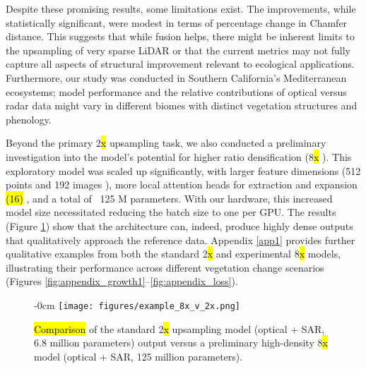 \documentclass[remotesensing,article,accept,pdftex,moreauthors]{Definitions/mdpi}
\begin{document}
Despite these promising results, some limitations exist. The improvements, while statistically significant, were modest in terms of percentage change in Chamfer distance. This suggests that while fusion helps, there might be inherent limits to the upsampling of very sparse LiDAR or that the current metrics may not fully capture all aspects of structural improvement relevant to ecological applications. Furthermore, our study was conducted in Southern California's Mediterranean ecosystems; model performance and the relative contributions of optical versus radar data might vary in different biomes with distinct vegetation structures and phenology.

Beyond the primary 2\hl{x} %
 upsampling task, we also conducted a preliminary investigation into the model's potential for higher ratio densification (8\hl{x}%
). This exploratory model was scaled up significantly, with larger feature dimensions (512 points and 192 images%
), more local attention heads for extraction and expansion \hl{(16)}%
, and a total of ~125 M parameters. With our hardware, this increased model size necessitated reducing the batch size to one per GPU. The results (Figure \ref{fig:upsampling_comparison_8x}) show that the architecture can, indeed, produce highly dense outputs that qualitatively approach the reference data. Appendix \ref{app1} provides further qualitative examples from both the standard 2\hl{x} %
 and experimental 8\hl{x} %
 models, illustrating their performance across different vegetation change scenarios (Figures \ref{fig:appendix_growth1}--\ref{fig:appendix_loss}).
 
 \vspace{-6pt}

\begin{figure}[H]
    \begin{adjustwidth}{-\extralength}{0cm}
    \centering
    \texttt{[image: figures/example\_8x\_v\_2x.png]}
    \end{adjustwidth}
    \caption{\hl{Comparison} %
 of the standard 2\hl{x} %
 upsampling model (optical + SAR, 6.8 million parameters) output versus a preliminary high-density 8\hl{x} %
 model (optical + SAR, 125 million parameters).}
    \label{fig:upsampling_comparison_8x}
\end{figure}
\end{document}
